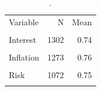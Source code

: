 \begin{table}[htbp]\centering
\caption{.}
\label{tab:finlit_summary}
\begin{tabular}{lrr}\toprule
Variable & N & Mean \\\\ \midrule
Interest & 1302 & 0.74 \\\\
Inflation & 1273 & 0.76 \\\\
Risk & 1072 & 0.75 \\\\
\bottomrule
\end{tabular}\end{table}
